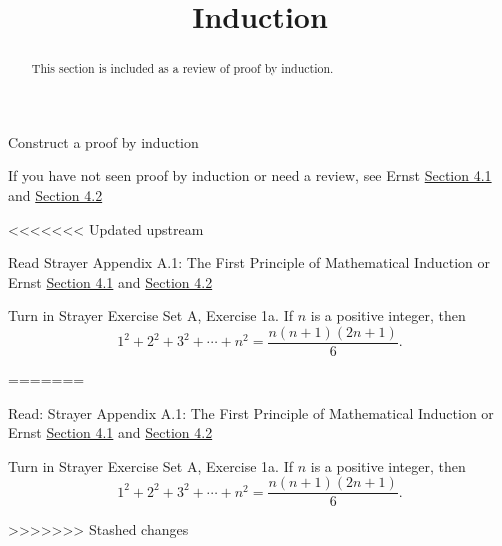 \documentclass{ximera}
\title{Induction}
\begin{document}
\begin{abstract}
  This section is included as a review of proof by induction.
\end{abstract}
\maketitle


\begin{obj}
\item Construct a proof by induction
\end{obj}

If you have not seen proof by induction or need a review, see Ernst \href{https://danaernst.com/IBL-IntroToProof/pretext/sec_Intro_to_Induction.html}{Section 4.1} and \href{https://danaernst.com/IBL-IntroToProof/pretext/sec_More_on_Induction.html}{Section 4.2}

<<<<<<< Updated upstream
\begin{instructorNotes}
  
  \begin{pre}
    \item[Read] Strayer Appendix A.1: The First Principle of Mathematical Induction  or Ernst \href{https://danaernst.com/IBL-IntroToProof/pretext/sec_Intro_to_Induction.html}{Section 4.1} and \href{https://danaernst.com/IBL-IntroToProof/pretext/sec_More_on_Induction.html}{Section 4.2}
   
    \item[Turn in] Strayer Exercise Set A, Exercise 1a. If $n$ is a positive integer, then 
      \[1^2+2^2+3^2+\cdots+n^2=\frac{n(n+1)(2n+1)}{6}.\]
  \end{pre}
\end{instructorNotes}
=======
\begin{pre}
  \item[Read:] Strayer Appendix A.1: The First Principle of Mathematical Induction  or Ernst \href{https://danaernst.com/IBL-IntroToProof/pretext/sec_Intro_to_Induction.html}{Section 4.1} and \href{https://danaernst.com/IBL-IntroToProof/pretext/sec_More_on_Induction.html}{Section 4.2}
   
  \item[Turn in] Strayer Exercise Set A, Exercise 1a. If $n$ is a positive integer, then 
      \[1^2+2^2+3^2+\cdots+n^2=\frac{n(n+1)(2n+1)}{6}.\]
\end{pre}

>>>>>>> Stashed changes
\end{document}
